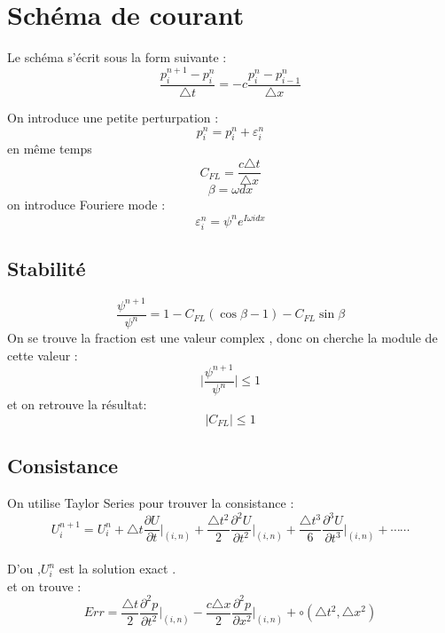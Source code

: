 \documentclass[a4paper,10pt]{report} %
\begin{document}
\section{Schéma de courant}

Le schéma s'écrit sous la form suivante :
\begin{equation}
\frac{p^{n+1}_i-p^{n}_i}{\triangle t}= -c\frac{p^{n}_i-p^{n}_{i-1}}{\triangle x}
\end{equation}

On introduce une petite perturpation :
\begin{equation}
p^n_i=p^n_i+\varepsilon^n_i
\end{equation}
en même temps
$$C_{FL}=\frac{c\triangle t}{\triangle x}$$
$$\beta=\omega dx$$
on introduce Fouriere mode :
\begin{equation}
\varepsilon^n_i=\psi ^ne^{I\omega i dx}
\end{equation}
\subsection{Stabilité}
\begin{equation}
\frac{\psi^{n+1}}{\psi^n}=1-C_{FL}(\cos\beta-1)-C_{FL}\sin\beta
\end{equation}
On se trouve la fraction est une valeur complex , donc on cherche la module de cette valeur :
$$\Big|\frac{\psi^{n+1}}{\psi^n}\Big|\leq 1$$
et on retrouve la résultat:
\begin{equation}
\Big|C_{FL}\Big|\leq 1
\end{equation}
\subsection{Consistance }
On utilise Taylor Series pour trouver la consistance :
\begin{equation}
U^{n+1}_i=U^{n}_i+\triangle t \frac{\partial U}{\partial t}\Big|_{(i,n)}+\frac{\triangle t^2}{2} \frac{\partial^2 U}{\partial t^2}\Big|_{(i,n)}+\frac{\triangle t^3}{6} \frac{\partial^3 U}{\partial t^3}\Big|_{(i,n)}+\cdots\cdots
\end{equation}
\\

D'ou ,$U^{n}_i$ est la solution exact .
\\

et on trouve :
\begin{equation}
Err=\frac{\triangle t}{2}\frac{\partial^2 p}{\partial t^2}\Big|_{(i,n)}-\frac{c\triangle x}{2}\frac{\partial^2 p}{\partial x^2}\Big|_{(i,n)}+\circ(\triangle t^2,\triangle x^2)
\end{equation}
\\
\end{document}
